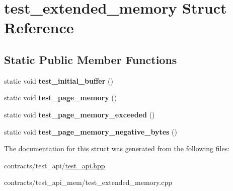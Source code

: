 \hypertarget{structtest__extended__memory}{}\section{test\+\_\+extended\+\_\+memory Struct Reference}
\label{structtest__extended__memory}
\subsection*{Static Public Member Functions}
\begin{DoxyCompactItemize}
\item 
\mbox{\label{structtest__extended__memory_a2091326c7277bf2ea571c72de6f6ef50}} 
static void {\bfseries test\+\_\+initial\+\_\+buffer} ()
\item 
\mbox{\label{structtest__extended__memory_aba5e6e10bc3e08d68aaaae22898c597e}} 
static void {\bfseries test\+\_\+page\+\_\+memory} ()
\item 
\mbox{\label{structtest__extended__memory_a7599425457818d62a94ae4ba63da8ee6}} 
static void {\bfseries test\+\_\+page\+\_\+memory\+\_\+exceeded} ()
\item 
\mbox{\label{structtest__extended__memory_a48be99ccdbcd86a86e35dc4add149dca}} 
static void {\bfseries test\+\_\+page\+\_\+memory\+\_\+negative\+\_\+bytes} ()
\end{DoxyCompactItemize}


The documentation for this struct was generated from the following files\+:\begin{DoxyCompactItemize}
\item 
contracts/test\+\_\+api/\mbox{\hyperlink{test__api_8hpp}{test\+\_\+api.\+hpp}}\item 
contracts/test\+\_\+api\+\_\+mem/test\+\_\+extended\+\_\+memory.\+cpp\end{DoxyCompactItemize}
